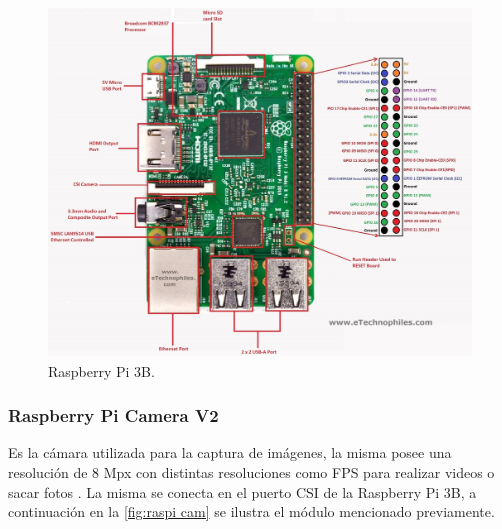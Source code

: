 \documentclass[11pt,a4paper]{article}
\begin{document}
	\begin{figure}[h!]
		\centering
		\includegraphics[width=\linewidth]{imagenes/raspi_pinout.jpg}
		\caption{Raspberry Pi 3B.}
		\label{fig:raspi}
	\end{figure}
	
	\subsubsection{Raspberry Pi Camera V2}
	Es la cámara utilizada para la captura de imágenes, la misma posee una resolución de 8 Mpx con distintas resoluciones como FPS para realizar videos o sacar fotos \cite{raspi cam}. La misma se conecta en el puerto CSI de la Raspberry Pi 3B, a continuación en la \autoref*{fig:raspi cam} se ilustra el módulo mencionado previamente.
	
\end{document}
